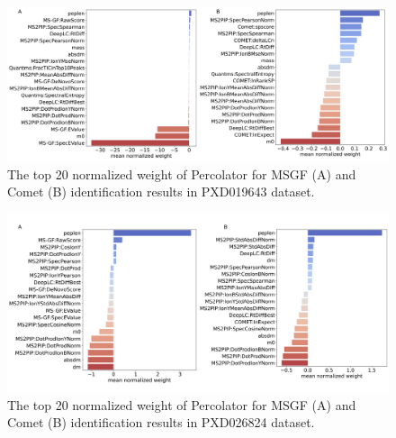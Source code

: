 \documentclass[12pt]{article}
\begin{document}
\begin{figure}[h!]
	\centering
	\includegraphics[width=1\textwidth]{figures//PXD019643_weights.png}
	\caption{The top 20 normalized weight of Percolator for MSGF (A) and Comet (B) identification results in PXD019643 dataset.}
	\label{fig:PXD019643_features}
\end{figure}

\begin{figure}[h!]
	\centering
	\includegraphics[width=1\textwidth]{figures//phos_weights.png}
	\caption{The top 20 normalized weight of Percolator for MSGF (A) and Comet (B) identification results in PXD026824 dataset.}
	\label{fig:phospho_features}
\end{figure}
\end{document}

